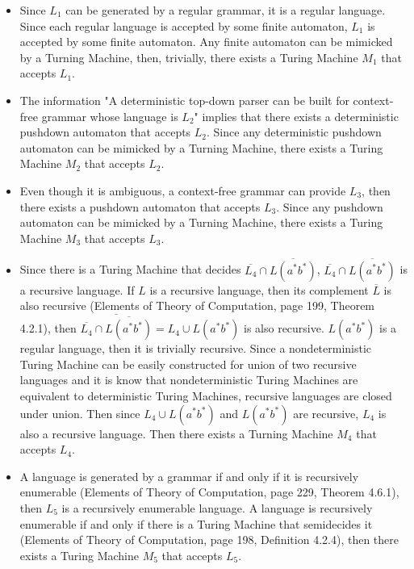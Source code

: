 \documentclass[12pt]{article}
\begin{document}
\begin{itemize}
\item Since $L_1$ can be generated by a regular grammar, it is a regular language. Since each regular language is accepted by some finite automaton, $L_1$ is accepted by some finite automaton. Any finite automaton can be mimicked by a Turning Machine, then, trivially, there exists a Turing Machine $M_1$ that accepts $L_1$.
\item The information "A deterministic top-down parser can be built for context-free grammar whose language is $L_2$" implies that there exists a deterministic pushdown automaton that accepts $L_2$. Since any deterministic pushdown automaton can be mimicked by a Turning Machine,  there exists a Turing Machine $M_2$ that accepts $L_2$.
\item Even though it is ambiguous, a context-free grammar can provide $L_3$, then there exists a pushdown automaton that accepts $L_3$. Since any pushdown automaton can be mimicked by a Turning Machine,  there exists a Turing Machine $M_3$ that accepts $L_3$.
\item Since there is a Turing Machine that decides $\overline{L_4} \cap \overline{L(a^*b^*)}$, $\overline{L_4} \cap \overline{L(a^*b^*)}$ is a recursive language. If $L$ is a recursive language, then its complement $\overline{L}$ is also recursive (Elements of Theory of Computation, page 199, Theorem 4.2.1), then $\overline{\overline{L_4} \cap \overline{L(a^*b^*)}} = L_4 \cup L(a^*b^*)$ is also recursive. $L(a^*b^*)$ is a regular language, then it is trivially recursive. Since a nondeterministic Turing Machine can be easily constructed for union of two recursive languages and it is know that nondeterministic Turing Machines are equivalent to deterministic Turing Machines, recursive languages are closed under union. Then since $L_4 \cup L(a^*b^*)$ and $L(a^*b^*)$ are recursive, $L_4$ is also a recursive language. Then there exists a Turning Machine $M_4$ that accepts $L_4$.
\item A language is generated by a grammar if and only if it is recursively enumerable (Elements of Theory of Computation, page 229, Theorem 4.6.1), then $L_5$ is a recursively enumerable language. A language is recursively enumerable if and only if there is a Turing Machine that semidecides it (Elements of Theory of Computation, page 198, Definition 4.2.4), then there exists a Turing Machine $M_5$ that accepts $L_5$.
\end{itemize}
\end{document}
